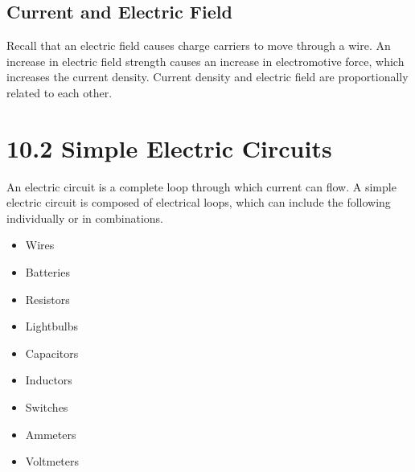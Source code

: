\documentclass[12pt, titlepage]{article}
\begin{document}
\subsection*{Current and Electric Field}
Recall that an electric field causes charge carriers to move through a wire. An increase in electric field strength causes an increase in electromotive force, which increases the current density. Current density and electric field are proportionally related to each other.

\section*{10.2 Simple Electric Circuits}

An electric circuit is a complete loop through which current can flow. A simple electric circuit is composed of electrical loops, which can include the following individually or in combinations.
\begin{multicols}{2}
    \begin{itemize}
        \item Wires
        \item Batteries
        \item Resistors
        \item Lightbulbs
        \item Capacitors
        \item Inductors
        \item Switches
        \item Ammeters
        \item Voltmeters
    \end{itemize}
\end{multicols}
\end{document}
